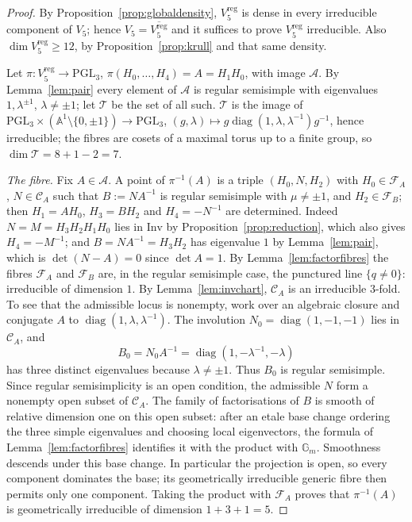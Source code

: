 \documentclass[11pt,a4paper]{article}
\theoremstyle{plain}
\theoremstyle{definition}
\theoremstyle{remark}
\newcommand{\PGL}{\mathrm{PGL}}
\begin{document}
\begin{proof}
By Proposition~\ref{prop:globaldensity}, $V_5^{\mathrm{reg}}$ is dense in every
irreducible component of $V_5$; hence $V_5=\overline{V_5^{\mathrm{reg}}}$ and it
suffices to prove $V_5^{\mathrm{reg}}$ irreducible. Also
$\dim V_5^{\mathrm{reg}}\ge12$, by Proposition~\ref{prop:krull} and that same
density.

Let $\pi:V_5^{\mathrm{reg}}\to\PGL_3$, $\pi(H_0,\dots,H_4)=A=H_1H_0$, with image
$\mathcal A$. By Lemma~\ref{lem:pair} every element of $\mathcal A$ is regular
semisimple with eigenvalues $1,\lambda^{\pm1}$, $\lambda\neq\pm1$; let $\mathcal T$
be the set of all such. $\mathcal T$ is the image of
$\PGL_3\times(\mathbb{A}^1\setminus\{0,\pm1\})\to\PGL_3$,
$(g,\lambda)\mapsto g\operatorname{diag}(1,\lambda,\lambda^{-1})g^{-1}$, hence
irreducible; the fibres are cosets of a maximal torus up to a finite group, so
$\dim\mathcal T=8+1-2=7$.

\emph{The fibre.} Fix $A\in\mathcal A$. A point of $\pi^{-1}(A)$ is a triple
$(H_0,N,H_2)$ with $H_0\in\mathcal F_A$, $N\in\mathcal C_A$ such that
$B:=NA^{-1}$ is regular semisimple with $\mu\neq\pm1$, and $H_2\in\mathcal F_B$;
then $H_1=AH_0$, $H_3=BH_2$ and $H_4=-N^{-1}$ are determined. Indeed
$N=M=H_3H_2H_1H_0$ lies in $\mathrm{Inv}$ by Proposition~\ref{prop:reduction},
which also gives $H_4=-M^{-1}$; and $B=NA^{-1}=H_3H_2$ has eigenvalue $1$ by
Lemma~\ref{lem:pair}, which is $\det(N-A)=0$ since $\det A=1$. By
Lemma~\ref{lem:factorfibres} the fibres $\mathcal F_A$ and $\mathcal F_B$ are, in
the regular semisimple case, the punctured line $\{q\neq0\}$: irreducible of
dimension $1$. By Lemma~\ref{lem:invchart}, $\mathcal C_A$ is an irreducible $3$-fold. To see that the admissible locus is nonempty, work over an algebraic closure and conjugate $A$ to $\operatorname{diag}(1,\lambda,\lambda^{-1})$. The involution $N_0=\operatorname{diag}(1,-1,-1)$ lies in $\mathcal C_A$, and
\[
 B_0=N_0A^{-1}=\operatorname{diag}(1,-\lambda^{-1},-\lambda)
\]
has three distinct eigenvalues because $\lambda\neq\pm1$. Thus $B_0$ is regular semisimple. Since regular semisimplicity is an open condition, the admissible $N$ form a nonempty open subset of $\mathcal C_A$. The family of factorisations of $B$ is smooth of relative dimension one on this open subset:
after an etale base change ordering the three simple eigenvalues and choosing
local eigenvectors, the formula of Lemma~\ref{lem:factorfibres} identifies it
with the product with $\mathbb G_m$. Smoothness descends under this base change.
In particular the projection is open, so every component dominates the base;
its geometrically irreducible generic fibre then permits only one component.
Taking the product with $\mathcal F_A$ proves that $\pi^{-1}(A)$ is
geometrically irreducible of dimension $1+3+1=5$.


\end{proof}
\end{document}

